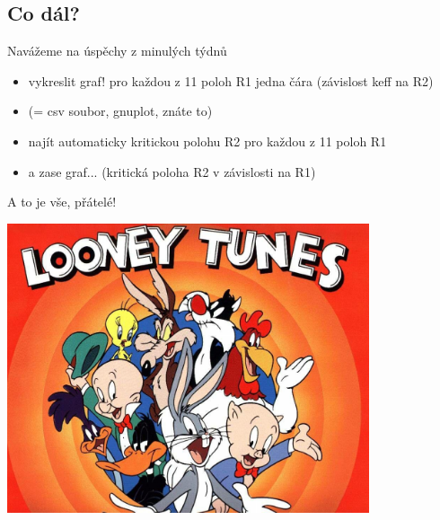 \documentclass{beamer}
\begin{document}
\subsection{Co dál?}

\begin{frame}{Navážeme na úspěchy z minulých týdnů}
  \begin{itemize}
    \item vykreslit graf! pro každou z 11 poloh R1 jedna čára (závislost keff na R2)
    \item (= csv soubor, gnuplot, znáte to)
    \item najít automaticky kritickou polohu R2 pro každou z 11 poloh R1
    \item a zase graf... (kritická poloha R2 v závislosti na R1)
  \end{itemize}
\end{frame}

\begin{frame}{A to je vše, přátelé!}
  \begin{center}
    \includegraphics[width=0.8\textwidth]{looney_tunes}
  \end{center}
\end{frame}
\end{document}
